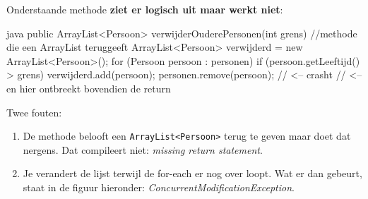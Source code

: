 \documentclass[a4paper,11pt]{article}
\begin{document}
Onderstaande methode \textbf{ziet er
    logisch uit maar werkt niet}:

\begin{codeblock}{java}
    public ArrayList<Persoon> verwijderOuderePersonen(int grens) //methode die een ArrayList teruggeeft
        {
            ArrayList<Persoon> verwijderd = new ArrayList<Persoon>();
            for (Persoon persoon : personen)
            {
                    if (persoon.getLeeftijd() > grens)
                    {
                            verwijderd.add(persoon);
                            personen.remove(persoon); // <-- crasht
                        }
                }
            // <-- en hier ontbreekt bovendien de return
        }
\end{codeblock}

Twee fouten:
\begin{enumerate}
    \item De methode belooft een \texttt{ArrayList<Persoon>} terug te geven maar
          doet dat nergens. Dat compileert niet:
          \textit{missing return statement}.
    \item Je verandert de lijst terwijl de for-each er nog over loopt. Wat er dan
          gebeurt, staat in de figuur hieronder:
          \textit{ConcurrentModificationException}.
\end{enumerate}
\end{document}
